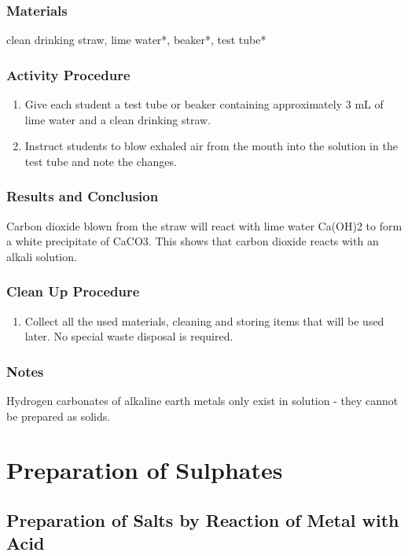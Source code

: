 \subsubsection*{Materials}
clean drinking straw, lime water*, beaker*, test tube*

\subsubsection*{Activity Procedure}
\begin{enumerate}
\item{Give each student a test tube or beaker containing approximately 3 mL of lime water and a clean drinking straw.}
\item{Instruct students to blow exhaled air from the mouth into the solution in the test tube and note the changes.}
\end{enumerate}

\subsubsection*{Results and Conclusion}
Carbon dioxide blown from the straw will react with lime water Ca(OH)2 to form a white precipitate of CaCO3. This shows that carbon dioxide reacts with an alkali solution.

\subsubsection*{Clean Up Procedure}
\begin{enumerate}
\item{Collect all the used materials, cleaning and storing items that will be used later. No special waste disposal is required.}
\end{enumerate}

\subsubsection*{Notes}
Hydrogen carbonates of alkaline earth metals only exist in solution - they cannot be prepared as solids.




\section{Preparation of Sulphates}

\subsection{ Preparation of Salts by Reaction of Metal with Acid}

